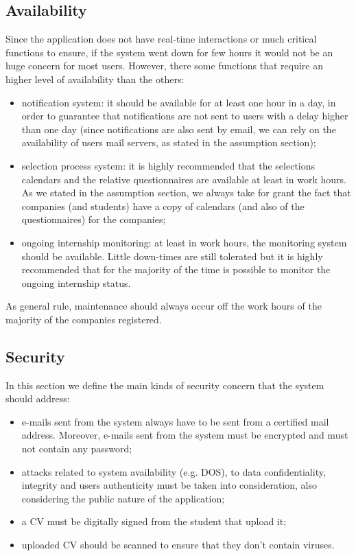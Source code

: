 		\subsection{Availability}
			Since the application does not have real-time interactions or much critical functions to ensure, if the system went down for few hours it would not be an huge concern for most users. However, there some functions that require an higher level of availability than the others:
			\begin{itemize}
				\item notification system: it should be available for at least one hour in a day, in order to guarantee that notifications are not sent to users with a delay higher than one day (since notifications are also sent by email, we can rely on the availability of users mail servers, as stated in the assumption section);
				\item selection process system: it is highly recommended that the selections calendars and the relative questionnaires are available at least in work hours. As we stated in the assumption section, we always take for grant the fact that companies (and students) have a copy of calendars (and also of the questionnaires) for the companies;
				\item ongoing internship monitoring: at least in work hours, the monitoring system should be available. Little down-times are still tolerated but it is highly recommended that for the majority of the time is possible to monitor the ongoing internship status.
			\end{itemize}
			As general rule, maintenance should always occur off the work hours of the majority of the companies registered.
		\subsection{Security}
			In this section we define the main kinds of security concern that the system should address:
			\begin{itemize}
				\item e-mails sent from the system always have to be sent from a certified mail address. Moreover, e-mails sent from the system must be encrypted and must not contain any password;
				\item attacks related to system availability (e.g. DOS), to data confidentiality, integrity and users authenticity must be taken into consideration, also considering the public nature of the application;
				\item a CV must be digitally signed from the student that upload it;
				\item uploaded CV should be scanned to ensure that they don't contain viruses.
			\end{itemize}
